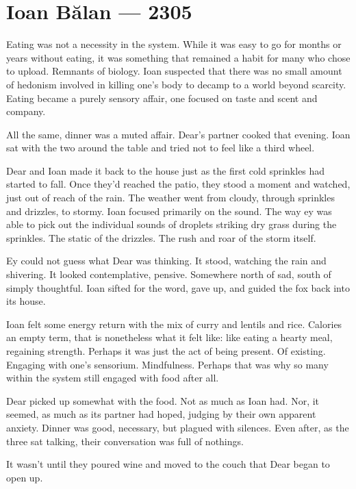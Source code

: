 \hypertarget{ioan-bux103lan-2305}{%
\chapter*{Ioan Bălan — 2305}\label{ioan-bux103lan-2305}}

Eating was not a necessity in the system. While it was easy to go for months or years without eating, it was something that remained a habit for many who chose to upload. Remnants of biology. Ioan suspected that there was no small amount of hedonism involved in killing one's body to decamp to a world beyond scarcity. Eating became a purely sensory affair, one focused on taste and scent and company.

All the same, dinner was a muted affair. Dear's partner cooked that evening. Ioan sat with the two around the table and tried not to feel like a third wheel.

Dear and Ioan made it back to the house just as the first cold sprinkles had started to fall. Once they'd reached the patio, they stood a moment and watched, just out of reach of the rain. The weather went from cloudy, through sprinkles and drizzles, to stormy. Ioan focused primarily on the sound. The way ey was able to pick out the individual sounds of droplets striking dry grass during the sprinkles. The static of the drizzles. The rush and roar of the storm itself.

Ey could not guess what Dear was thinking. It stood, watching the rain and shivering. It looked contemplative, pensive. Somewhere north of sad, south of simply thoughtful. Ioan sifted for the word, gave up, and guided the fox back into its house.

Ioan felt some energy return with the mix of curry and lentils and rice. Calories an empty term, that is nonetheless what it felt like: like eating a hearty meal, regaining strength. Perhaps it was just the act of being present. Of existing. Engaging with one's sensorium. Mindfulness. Perhaps that was why so many within the system still engaged with food after all.

Dear picked up somewhat with the food. Not as much as Ioan had. Nor, it seemed, as much as its partner had hoped, judging by their own apparent anxiety. Dinner was good, necessary, but plagued with silences. Even after, as the three sat talking, their conversation was full of nothings.

It wasn't until they poured wine and moved to the couch that Dear began to open up.

